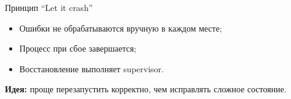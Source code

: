 \begin{frame}{Принцип “Let it crash”}
	\begin{itemize}
		\item Ошибки не обрабатываются вручную в каждом месте;
		\item Процесс при сбое завершается;
		\item Восстановление выполняет supervisor.
	\end{itemize}
	
	\vspace{0.5em}
	\textbf{Идея:} проще перезапустить корректно, чем исправлять сложное состояние.
\end{frame}
